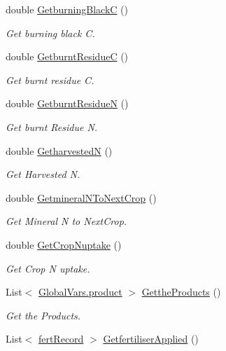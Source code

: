 \begin{DoxyCompactItemize}
double \mbox{\hyperlink{class_crop_class_a173b98eb2eeae57f6d3704a3ac4ff256}{Getburning\+BlackC}} ()
\begin{DoxyCompactList}\small\item\em Get burning black C. \end{DoxyCompactList}\item 
double \mbox{\hyperlink{class_crop_class_a973439ffcd943c40f65d766560f4eb66}{Getburnt\+ResidueC}} ()
\begin{DoxyCompactList}\small\item\em Get burnt residue C. \end{DoxyCompactList}\item 
double \mbox{\hyperlink{class_crop_class_a05c3902daff36db4fce5117ae1ccd771}{Getburnt\+ResidueN}} ()
\begin{DoxyCompactList}\small\item\em Get burnt Residue N. \end{DoxyCompactList}\item 
double \mbox{\hyperlink{class_crop_class_a646ad4cebd2bb84233e30e10ecdbb5d3}{GetharvestedN}} ()
\begin{DoxyCompactList}\small\item\em Get Harvested N. \end{DoxyCompactList}\item 
double \mbox{\hyperlink{class_crop_class_a52a59935e6b699010f0fa503b8d2237d}{Getmineral\+N\+To\+Next\+Crop}} ()
\begin{DoxyCompactList}\small\item\em Get Mineral N to Next\+Crop. \end{DoxyCompactList}\item 
double \mbox{\hyperlink{class_crop_class_a8e184ac8b8d9fabd89316b19e897b196}{Get\+Crop\+Nuptake}} ()
\begin{DoxyCompactList}\small\item\em Get Crop N uptake. \end{DoxyCompactList}\item 
List$<$ \mbox{\hyperlink{class_global_vars_1_1product}{Global\+Vars.\+product}} $>$ \mbox{\hyperlink{class_crop_class_a080b41c202c94069edf623266ff89555}{Getthe\+Products}} ()
\begin{DoxyCompactList}\small\item\em Get the Products. \end{DoxyCompactList}\item 
List$<$ \mbox{\hyperlink{classfert_record}{fert\+Record}} $>$ \mbox{\hyperlink{class_crop_class_af0455a67b05e1ff2679f0f37062dc2e8}{Getfertiliser\+Applied}} ()

\end{DoxyCompactItemize}
